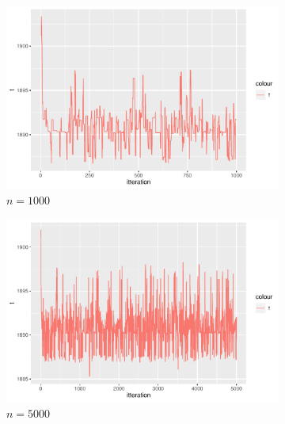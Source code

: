 \begin{figure}[h]
    \centering
    \begin{subfigure}[b]{0.49\textwidth}
        \centering
        \includegraphics[width = \textwidth]{Images/sim_t_1000.pdf}
        \caption{$n =1000 $}
        \label{fig:}
    \end{subfigure}
    \begin{subfigure}[b]{0.49\textwidth}
        \centering
        \includegraphics[width = \textwidth]{Images/sim_t_5000.pdf}
        \caption{$n = 5000 $}
        \label{fig:}
    \end{subfigure}
    \begin{subfigure}[b]{0.49\textwidth}
        \centering

\end{subfigure}
\end{figure}
